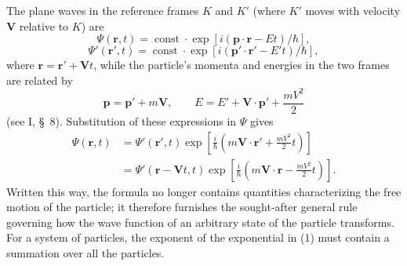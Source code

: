 The plane waves in the reference frames $K$ and $K'$ (where $K'$ moves with
velocity $\mathbf V$ relative to $K$) are
\[
  \Psi(\mathbf r,t)=\operatorname{const}\cdot
  \exp[i(\mathbf p\cdot\mathbf r-Et)/\hbar],
\]
\[
  \Psi'(\mathbf r',t)=\operatorname{const}\cdot
  \exp[i(\mathbf p'\cdot\mathbf r'-E't)/\hbar],
\]
where $\mathbf r=\mathbf r'+\mathbf Vt$, while the particle's momenta and
energies in the two frames are related by
\[
  \mathbf p=\mathbf p'+m\mathbf V,
  \qquad
  E=E'+\mathbf V\cdot\mathbf p'+\frac{mV^2}{2}
\]
(see I, \S~8). Substitution of these expressions in $\Psi$ gives
\begin{equation}
  \begin{aligned}
    \Psi(\mathbf r,t)
      &=\Psi'(\mathbf r',t)
        \exp\left[\frac{i}{\hbar}
          \left(m\mathbf V\cdot\mathbf r'+\frac{mV^2}{2}t\right)\right]\\
      &=\Psi'(\mathbf r-\mathbf Vt,t)
        \exp\left[\frac{i}{\hbar}
          \left(m\mathbf V\cdot\mathbf r-\frac{mV^2}{2}t\right)\right].
  \end{aligned}
  \tag{1}
\end{equation}
Written this way, the formula no longer contains quantities characterizing
the free motion of the particle; it therefore furnishes the sought-after
general rule governing how the wave function of an arbitrary state of the
particle transforms. For a system of particles, the exponent of the
exponential in (1) must contain a summation over all the particles.
